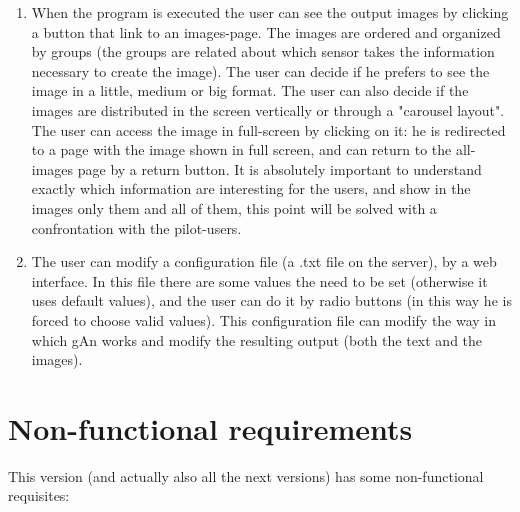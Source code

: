 \begin{enumerate}
\item When the program is executed the user can see the output images by clicking a button that link to an images-page. The images are ordered and organized by groups (the groups are related about which sensor takes the information necessary to create the image). The user can decide if he prefers to see the image in a little, medium or big format. The user can also decide if the images are distributed in the screen vertically or through a "carousel layout". The user can access the image in full-screen by clicking on it: he is redirected to a page with the image shown in full screen, and can return to the all-images page by a return button. It is absolutely important to understand exactly which information are interesting for the users, and show in the images only them and all of them, this point will be solved with a confrontation with the pilot-users. 

\item The user can modify a configuration file (a .txt file on the server), by a web interface. In this file there are some values the need to be set (otherwise it uses default values), and the user can do it by radio buttons (in this way he is forced to choose valid values). This configuration file can modify the way in which gAn works and modify the resulting output (both the text and the images).   

\end{enumerate}

 
\section{Non-functional requirements}

This version (and actually also all the next versions) has some non-functional requisites:

